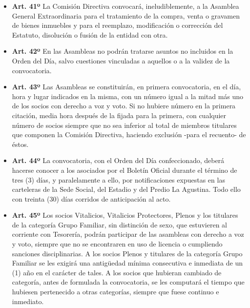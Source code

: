 \documentclass[openany]{book}
\providecommand{\tightlist}{%
  \setlength{\itemsep}{0pt}\setlength{\parskip}{0pt}}
\begin{document}
\begin{itemize}
\tightlist
\item
  \textbf{Art. 41º}
  La Comisión Directiva convocará, ineludiblemente, a la Asamblea General Extraordinaria para el tratamiento de la compra, venta o gravamen de bienes inmuebles y para el reemplazo, modificación o corrección del Estatuto, disolución o fusión de la entidad con otra.
\end{itemize}

\begin{itemize}
\tightlist
\item
  \textbf{Art. 42º}
  En las Asambleas no podrán tratarse asuntos no incluidos en la Orden del Día, salvo cuestiones vinculadas a aquellos o a la validez de la convocatoria.
\end{itemize}

\begin{itemize}
\tightlist
\item
  \textbf{Art. 43º}
  Las Asambleas se constituirán, en primera convocatoria, en el día, hora y lugar indicados en la misma, con un número igual a la mitad más uno de los socios con derecho a voz y voto. Si no hubiere número en la primera citación, media hora después de la fijada para la primera, con cualquier número de socios siempre que no sea inferior al total de miembros titulares que componen la Comisión Directiva, haciendo exclusión -para el recuento- de éstos.
\end{itemize}

\begin{itemize}
\tightlist
\item
  \textbf{Art. 44º}
  La convocatoria, con el Orden del Día confeccionado, deberá hacerse conocer a los asociados por el Boletín Oficial durante el término de tres (3) días, y paralelamente a ello, por notificaciones expuestas en las carteleras de la Sede Social, del Estadio y del Predio La Agustina. Todo ello con treinta (30) días corridos de anticipación al acto.
\end{itemize}

\begin{itemize}
\tightlist
\item
  \textbf{Art. 45º}
  Los socios Vitalicios, Vitalicios Protectores, Plenos y los titulares de la categoría Grupo Familiar, sin distinción de sexo, que estuvieren al corriente con Tesorería, podrán participar de las asambleas con derecho a voz y voto, siempre que no se encontraren en uso de licencia o cumpliendo sanciones disciplinarias. A los socios Plenos y titulares de la categoría Grupo Familiar se les exigirá una antigüedad mínima consecutiva e inmediata de un (1) año en el carácter de tales. A los socios que hubieran cambiado de categoría, antes de formulada la convocatoria, se les computará el tiempo que hubiesen pertenecido a otras categorías, siempre que fuese continuo e inmediato.
\end{itemize}
\end{document}
